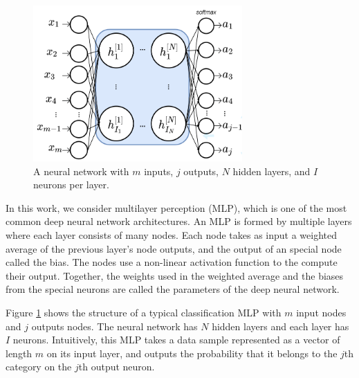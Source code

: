 \documentclass[conference]{IEEEtran}
\begin{document}
\begin{figure}[t]
\includegraphics[width=8cm, keepaspectratio]{SimpleNN}
\caption{A neural network with $m$ inputs, $j$ outputs,  $N$  hidden layers, and $I$ neurons per layer.}
\label{fig:SimplNN}
\end{figure}
In this work, we consider multilayer perception (MLP), which is one of the most common deep neural network architectures. An
MLP is formed by multiple layers where each layer consists of many nodes. Each node takes 
as input a weighted average of the previous layer's node outputs, and the output of an special node called the bias.  
The nodes use a non-linear activation function to the compute their output. Together, the weights used in the weighted average and
the biases from the special neurons are called the parameters of the deep neural network. 




Figure \ref{fig:SimplNN} shows the structure of a typical classification MLP with $m$ input nodes and $j$ outputs nodes. The neural network
has $N$ hidden layers and each layer has $I$ neurons. Intuitively, this MLP takes a data sample represented as a vector of length
$m$ on its input layer, and outputs the probability that it belongs to the $j$th category on the $j$th output neuron.
\end{document}
